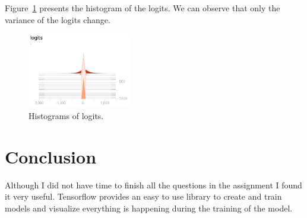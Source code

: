 \documentclass{article}
\begin{document}
Figure~\ref{fig:histogramlogits} presents the histogram of the logits.
We can observe that only the variance of the logits change.

\begin{figure}
\centering
\includegraphics[width=0.4\textwidth]{logits.png}
\caption{Histograms of logits.}
\label{fig:histogramlogits}
\end{figure}


\section{Conclusion}
Although I did not have time to finish all the questions in the assignment I found it very useful.
Tensorflow provides an easy to use library to create and train models and visualize everything is happening during the training of the model.
\end{document}

